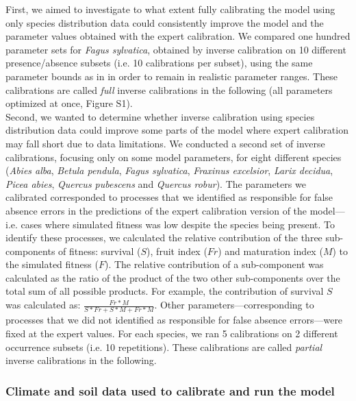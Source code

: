 \documentclass[preprint,12pt,authoryear]{elsarticle}
\begin{document}
\textcolor{customred}{First, we aimed to investigate to what extent fully calibrating the model using only species distribution data could consistently improve the model and the parameter values obtained with the expert calibration. We compared one hundred parameter sets for \emph{Fagus sylvatica}, obtained by inverse calibration on 10 different presence/absence subsets (i.e. 10 calibrations per subset),} using the same parameter bounds as in \citet{VanderMeersch2023} in order to remain in realistic parameter ranges. These calibrations are called \emph{full} inverse calibrations in the following (all parameters optimized at once, Figure S1). \\
\textcolor{customred}{Second, we wanted to determine whether inverse calibration using species distribution data could improve some parts of the model where expert calibration may fall short due to data limitations. We conducted a second set of inverse calibrations, focusing only on some model parameters, for eight different species} (\emph{Abies alba}, \emph{Betula pendula}, \emph{Fagus sylvatica}, \emph{Fraxinus excelsior}, \emph{Larix decidua}, \emph{Picea abies}, \emph{Quercus pubescens} and \emph{Quercus robur}). The parameters we calibrated corresponded to processes that we identified as responsible for false absence errors in the predictions of the expert calibration version of the model---i.e. cases where simulated fitness was low despite the species being present. To identify these processes, we calculated the relative contribution of the three sub-components of fitness: survival ($S$), fruit index ($Fr$) and maturation index ($M$) to the simulated fitness ($F$). The relative contribution of a \textcolor{customred}{sub-component} was calculated as the ratio of the product of the two other \textcolor{customred}{sub-components} over the total sum of all possible products. For example, the contribution of survival $S$ was calculated as: $\frac{Fr*M}{S*Fr+S*M+Fr*M}$. Other parameters---corresponding to processes that we did not identified as responsible for false absence errors---were fixed at the expert values. For each species, we ran 5 calibrations on 2 different occurrence subsets (i.e. 10 repetitions). These calibrations are called \emph{partial} inverse calibrations in the following. 

\subsubsection{Climate and soil data used to calibrate and run the model}
\end{document}
